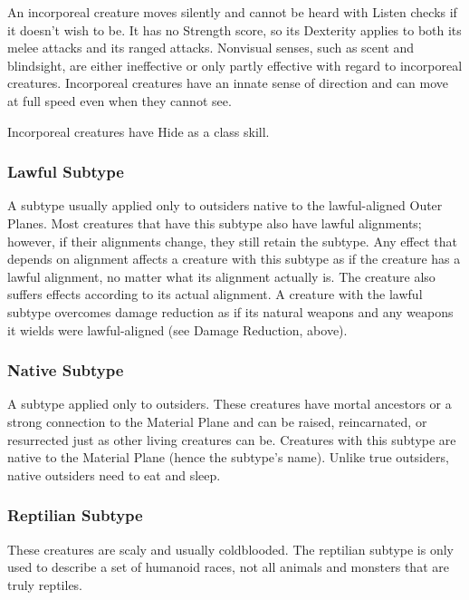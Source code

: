An incorporeal creature moves silently and cannot be heard with Listen checks if it doesn't wish to be. It has no Strength score, so its Dexterity applies to both its melee attacks and its ranged attacks. Nonvisual senses, such as scent and blindsight, are either ineffective or only partly effective with regard to incorporeal creatures. Incorporeal creatures have an innate sense of direction and can move at full speed even when they cannot see.

Incorporeal creatures have Hide as a class skill.

\subsubsection{Lawful Subtype} A subtype usually applied only to outsiders native to the lawful-aligned Outer Planes. Most creatures that have this subtype also have lawful alignments; however, if their alignments change, they still retain the subtype. Any effect that depends on alignment affects a creature with this subtype as if the creature has a lawful alignment, no matter what its alignment actually is. The creature also suffers effects according to its actual alignment. A creature with the lawful subtype overcomes damage reduction as if its natural weapons and any weapons it wields were lawful-aligned (see Damage Reduction, above).

\subsubsection{Native Subtype} A subtype applied only to outsiders. These creatures have mortal ancestors or a strong connection to the Material Plane and can be raised, reincarnated, or resurrected just as other living creatures can be. Creatures with this subtype are native to the Material Plane (hence the subtype's name). Unlike true outsiders, native outsiders need to eat and sleep. 

\subsubsection{Reptilian Subtype} These creatures are scaly and usually coldblooded. The reptilian subtype is only used to describe a set of humanoid races, not all animals and monsters that are truly reptiles.


